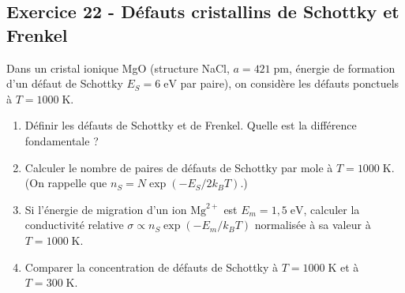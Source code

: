 \documentclass[12pt,a4paper]{article}
\begin{document}
\subsection*{Exercice 22 - Défauts cristallins de Schottky et Frenkel \niveau{\difficile}}

\begin{boiteexercice}
Dans un cristal ionique MgO (structure NaCl, $a=421\;\text{pm}$, énergie de formation d'un défaut de Schottky $E_S=6\;\text{eV}$ par paire), on considère les défauts ponctuels à $T=1000\;\text{K}$.
\begin{enumerate}
  \item Définir les défauts de Schottky et de Frenkel. Quelle est la différence fondamentale ?
  \item Calculer le nombre de paires de défauts de Schottky par mole à $T=1000\;\text{K}$. (On rappelle que $n_S = N\exp(-E_S/2k_BT)$.)
  \item Si l'énergie de migration d'un ion $\text{Mg}^{2+}$ est $E_m=1{,}5\;\text{eV}$, calculer la conductivité relative $\sigma\propto n_S\exp(-E_m/k_BT)$ normalisée à sa valeur à $T=1000\;\text{K}$.
  \item Comparer la concentration de défauts de Schottky à $T=1000\;\text{K}$ et à $T=300\;\text{K}$.
\end{enumerate}
\end{boiteexercice}
\end{document}
